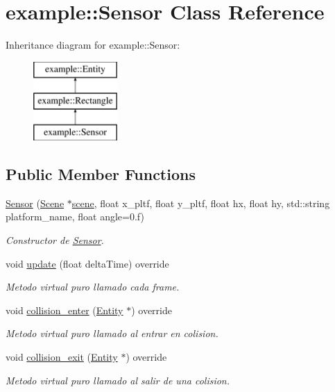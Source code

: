 \hypertarget{classexample_1_1_sensor}{}\section{example\+::Sensor Class Reference}
\label{classexample_1_1_sensor}
Inheritance diagram for example\+::Sensor\+:\begin{figure}[H]
\begin{center}
\leavevmode
\includegraphics[height=3.000000cm]{classexample_1_1_sensor}
\end{center}
\end{figure}
\subsection*{Public Member Functions}
\begin{DoxyCompactItemize}
\item 
\mbox{\hyperlink{classexample_1_1_sensor_af43334a558e2faf4563b5624e6c33319}{Sensor}} (\mbox{\hyperlink{classexample_1_1_scene}{Scene}} $\ast$\mbox{\hyperlink{classexample_1_1_entity_ab851dbde4a16829f9fb77ab9a66b9f1e}{scene}}, float x\+\_\+pltf, float y\+\_\+pltf, float hx, float hy, std\+::string platform\+\_\+name, float angle=0.f)
\begin{DoxyCompactList}\small\item\em Constructor de \mbox{\hyperlink{classexample_1_1_sensor}{Sensor}}. \end{DoxyCompactList}\item 
void \mbox{\hyperlink{classexample_1_1_sensor_a6db61100875509315537c46418fbc250}{update}} (float delta\+Time) override
\begin{DoxyCompactList}\small\item\em Metodo virtual puro llamado cada frame. \end{DoxyCompactList}\item 
void \mbox{\hyperlink{classexample_1_1_sensor_a3134d06af95de83a7392c3687411eb17}{collision\+\_\+enter}} (\mbox{\hyperlink{classexample_1_1_entity}{Entity}} $\ast$) override
\begin{DoxyCompactList}\small\item\em Metodo virtual puro llamado al entrar en colision. \end{DoxyCompactList}\item 
void \mbox{\hyperlink{classexample_1_1_sensor_a0bc1b5c11b00ac855c35863ffc9c70d9}{collision\+\_\+exit}} (\mbox{\hyperlink{classexample_1_1_entity}{Entity}} $\ast$) override
\begin{DoxyCompactList}\small\item\em Metodo virtual puro llamado al salir de una colision. \end{DoxyCompactList}\end{DoxyCompactItemize}
